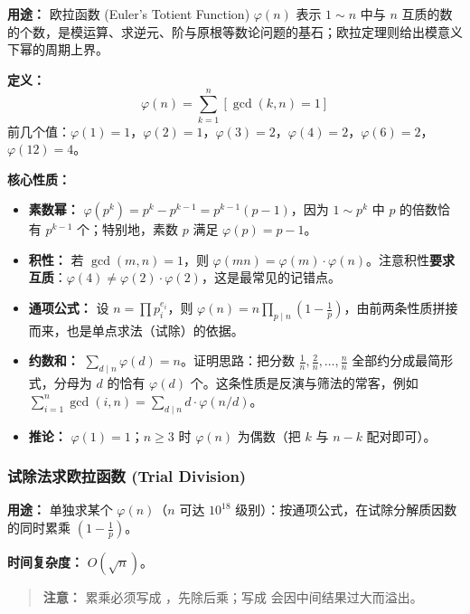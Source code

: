 \textbf{用途：}
欧拉函数 (Euler's Totient Function) $\varphi(n)$ 表示 $1 \sim n$ 中与 $n$ 互质的数的个数，是模运算、求逆元、阶与原根等数论问题的基石；欧拉定理则给出模意义下幂的周期上界。

\textbf{定义：}
\[
\varphi(n) = \sum_{k=1}^{n} [\gcd(k, n) = 1]
\]
前几个值：$\varphi(1) = 1$，$\varphi(2) = 1$，$\varphi(3) = 2$，$\varphi(4) = 2$，$\varphi(6) = 2$，$\varphi(12) = 4$。

\textbf{核心性质：}
\begin{itemize}
    \item \textbf{素数幂：} $\varphi(p^{k}) = p^{k} - p^{k-1} = p^{k-1}(p-1)$，因为 $1 \sim p^{k}$ 中 $p$ 的倍数恰有 $p^{k-1}$ 个；特别地，素数 $p$ 满足 $\varphi(p) = p - 1$。
    \item \textbf{积性：} 若 $\gcd(m, n) = 1$，则 $\varphi(mn) = \varphi(m) \cdot \varphi(n)$。注意积性\textbf{要求互质}：$\varphi(4) \neq \varphi(2) \cdot \varphi(2)$，这是最常见的记错点。
    \item \textbf{通项公式：} 设 $n = \prod p_i^{e_i}$，则 $\varphi(n) = n \prod_{p \mid n} \left(1 - \frac{1}{p}\right)$，由前两条性质拼接而来，也是单点求法（试除）的依据。
    \item \textbf{约数和：} $\sum_{d \mid n} \varphi(d) = n$。证明思路：把分数 $\frac{1}{n}, \frac{2}{n}, \dots, \frac{n}{n}$ 全部约分成最简形式，分母为 $d$ 的恰有 $\varphi(d)$ 个。这条性质是反演与筛法的常客，例如 $\sum_{i=1}^{n} \gcd(i, n) = \sum_{d \mid n} d \cdot \varphi(n/d)$。
    \item \textbf{推论：} $\varphi(1) = 1$；$n \ge 3$ 时 $\varphi(n)$ 为偶数（把 $k$ 与 $n-k$ 配对即可）。
\end{itemize}

\subsubsection{试除法求欧拉函数 (Trial Division)}

\textbf{用途：}
单独求某个 $\varphi(n)$（$n$ 可达 $10^{18}$ 级别）：按通项公式，在试除分解质因数的同时累乘 $\left(1 - \frac{1}{p}\right)$。

\textbf{时间复杂度：} $O(\sqrt{n})$。



\begin{quote}
\textbf{注意：} 累乘必须写成 ，先除后乘；写成  会因中间结果过大而溢出。
\end{quote}

